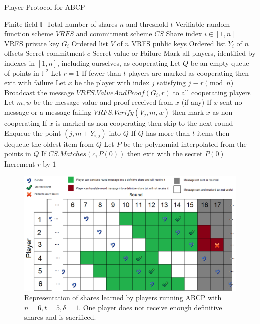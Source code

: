 \documentclass{dalcsthesis}
\begin{document}
\begin{algorithm}
  \caption{Player Protocol for ABCP}
  \label{alg:ABCP:Player}
  \begin{algorithmic}
    \INPUT Finite field $\mathbb{F}$
    \INPUT Total number of shares $n$ and threshold $t$
    \INPUT Verifiable random function scheme $VRFS$ and commitment scheme $CS$
    \INPUT Share index $i \in [1, n]$
    \INPUT VRFS private key $G_i$
    \INPUT Ordered list $V$ of $n$ VRFS public keys
    \INPUT Ordered list $Y_i$ of $n$ offsets
    \INPUT Secret commitment $c$
    \OUTPUT Secret value or Failure
    \STATE Mark all players, identified by indexes in $[1,n]$, including ourselves, as cooperating
    \STATE Let $Q$ be an empty queue of points in $\mathbb{F}^2$
    \STATE Let $r = 1$
	  \STATE If fewer than $t$ players are marked as cooperating then exit with failure
	  \STATE Let $x$ be the player with index $j$ satisfying $j \equiv r \pmod{n}$
	  	 \STATE Broadcast the message $VRFS.ValueAndProof(G_i, r)$ to all cooperating players
	  \ENDIF
	  \STATE Let $m, w$ be the message value and proof received from $x$ (if any)
	  \STATE If $x$ sent no message or a message failing $VRFS.Verify(V_j, m, w)$ then mark $x$ as non-cooperating
	  \STATE If $x$ is marked as non-cooperating then skip to the next round
	  \STATE Enqueue the point $(j, m + Y_{i,j})$ into $Q$
      \STATE If $Q$ has more than $t$ items then dequeue the oldest item from $Q$
	   	\STATE Let $P$ be the polynomial interpolated from the points in $Q$
	    \STATE If $CS.Matches(c, P(0))$ then exit with the secret $P(0)$
	  \ENDIF
      \STATE Increment $r$ by $1$
	\ENDWHILE
  \end{algorithmic}
\end{algorithm}
\begin{figure}
\includegraphics[width=\textwidth]{../../Graphics/AsyncVerifiedSecret_n6t5d1.png}
\caption{Representation of shares learned by players running ABCP with $n=6, t=5, \delta=1$. One player does not receive enough definitive shares and is sacrificed.}
\label{img:ex:ABCP}
\end{figure}
\end{document}
